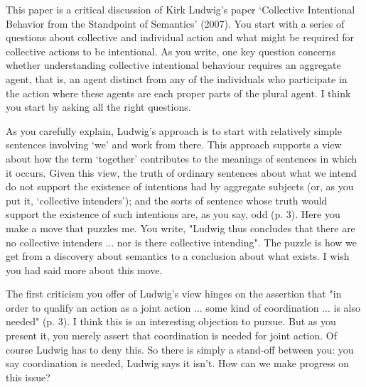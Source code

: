 \documentclass[12pt,a4paper]{extarticle}
\begin{document}
\setlength\footnotesep{1em}


\author{}
\date{}


\maketitle




This paper is a critical discussion of Kirk Ludwig's paper `Collective Intentional Behavior from the Standpoint of Semantics' (2007).  You start with a series of questions about collective and individual action and what might be required for collective actions to be intentional.  As you write, one key question concerns whether understanding collective intentional behaviour requires an aggregate agent, that is, an agent distinct from any of the individuals who participate in the action where these agents are each proper parts of the plural agent.  I think you start by asking all the right questions.

As you carefully explain, Ludwig's approach is to start with relatively simple sentences involving `we' and work from there.  This approach supports a view about how the term `together' contributes to the meanings of sentences in which it occurs.  Given this view, the truth of ordinary sentences about what we intend do not support the existence of intentions had by aggregate subjects (or, as you put it, `collective intenders'); and the sorts of sentence whose truth would support the existence of such intentions are, as you say, odd (p. 3).  Here you make a move that puzzles me.  You write, "Ludwig thus concludes that there are no collective intenders ... nor is there collective intending".  The puzzle is how we get from a discovery about semantics to a conclusion about what exists.  I wish you had said more about this move.

The first criticism you offer of Ludwig's view hinges on the assertion that "in order to qualify an action as a joint action ... some kind of coordination ... is also needed" (p. 3).  I think this is an interesting objection to pursue.  But as you present it, you merely assert that coordination is needed for joint action.  Of course Ludwig has to deny this.  So there is simply a stand-off between you: you say coordination is needed, Ludwig says it isn't.  How can we make progress on this issue?
\end{document}
